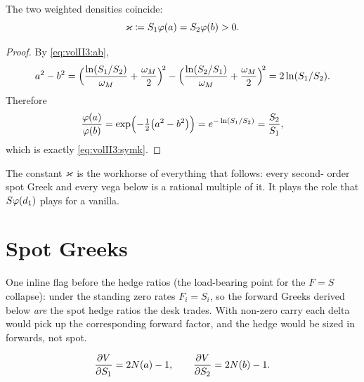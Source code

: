 \begin{lemma}\label{lem:volII3:symk}
The two weighted densities coincide:
\begin{equation}\label{eq:volII3:symk}
\varkappa \coloneqq S_1\varphi(a) = S_2\varphi(b) > 0 .
\end{equation}
\end{lemma}

\begin{proof}
By \eqref{eq:volII3:ab},
\begin{equation}\label{eq:volII3:a2b2}
a^2 - b^2
= \Bigl(\frac{\ln(S_1/S_2)}{\omega_M} + \frac{\omega_M}{2}\Bigr)^{\!2}
- \Bigl(\frac{\ln(S_2/S_1)}{\omega_M} + \frac{\omega_M}{2}\Bigr)^{\!2}
= 2\ln(S_1/S_2).
\end{equation}
Therefore
\begin{equation}\label{eq:volII3:pdfratio}
\frac{\varphi(a)}{\varphi(b)} = \exp\Bigl(-\tfrac12\bigl(a^2 - b^2\bigr)\Bigr)
= e^{-\ln(S_1/S_2)} = \frac{S_2}{S_1},
\end{equation}
which is exactly \eqref{eq:volII3:symk}.
\end{proof}

The constant $\varkappa$ is the workhorse of everything that follows: every second-
order spot Greek and every vega below is a rational multiple of it. It plays
the role that $S\varphi(d_1)$ plays for a vanilla.

\section{Spot Greeks}
\label{sec:volII3:spot}

One inline flag before the hedge ratios (the load-bearing point for the $F = S$
collapse): under the standing zero rates $F_i = S_i$, so the forward Greeks
derived below \emph{are} the spot hedge ratios the desk trades. With non-zero
carry each delta would pick up the corresponding forward factor, and the hedge
would be sized in forwards, not spot.

\begin{proposition}\label{prop:volII3:deltas}
\begin{equation}\label{eq:volII3:deltas}
\frac{\partial V}{\partial S_1} = 2N(a) - 1, \qquad
\frac{\partial V}{\partial S_2} = 2N(b) - 1 .
\end{equation}
\end{proposition}

